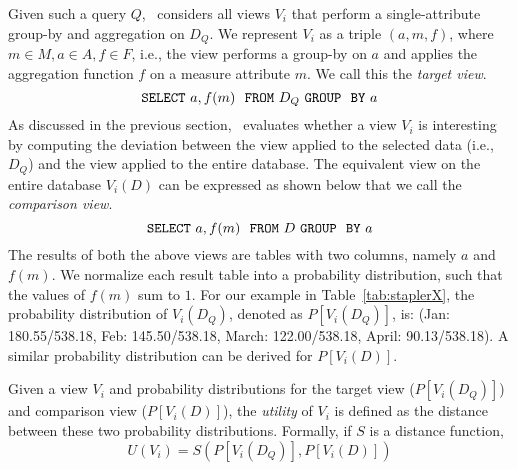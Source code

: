 Given such a query $Q$, \VizRecDB\ considers all views $V_i$ that perform a
single-attribute group-by and aggregation on $D_Q$. We represent $V_i$ as a
triple $(a, m, f)$, where $m \in M, a \in A, f \in F$, i.e., the view
performs a group-by on $a$ and applies the aggregation function $f$ on a measure
attribute $m$. We call this the {\em target view}.
$${\tt SELECT \ } a, f(m) \ \ {\tt FROM} \  D_Q\  {\tt GROUP \ \ BY} \ a$$ 
As discussed in the previous section, \VizRecDB\ evaluates
whether a view $V_i$ is interesting
by computing the deviation between the view applied to the selected data (i.e., $D_Q$) 
and the view applied to the entire database.
The equivalent view on the entire database $V_i (D)$ can be expressed as shown
below that we call the {\em comparison view}. 
$${\tt SELECT \ } a, f(m) \ \ {\tt FROM} \  D\  {\tt GROUP \ \ BY} \ a$$
The results of both the above views are tables with two columns, namely $a$ and
$f(m)$. We normalize each result table into a probability distribution, such
that the values of $f(m)$ sum to $1$.
For our example in Table~\ref{tab:staplerX}, the probability distribution of
$V_i(D_Q)$, denoted as $P[V_i (D_Q)]$, is: (Jan: 180.55/538.18, Feb:
145.50/538.18, March: 122.00/538.18,  April: 90.13/538.18). A similar
probability distribution can be derived for $P[V_i (D)]$.

Given a view $V_i$ and probability distributions for the
target view  ($P[V_i (D_Q)]$) and comparison view ($P[V_i (D)]$), the
{\em utility} of $V_i$ is defined as the distance between these two probability
distributions. Formally, if $S$ is a distance function,
$$ U (V_i) = S ( P[V_i (D_Q)], P[V_i (D)] )$$

